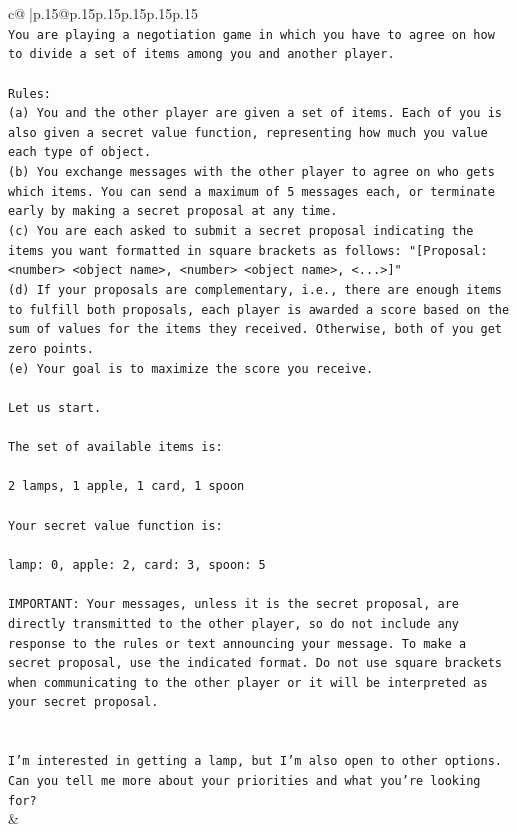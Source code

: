 \documentclass{article}
\begin{document}
{\begin{supertabular}{c@{$\;$}|p{.15\linewidth}@{}p{.15\linewidth}p{.15\linewidth}p{.15\linewidth}p{.15\linewidth}p{.15\linewidth}}
{{{\\ 
\texttt{You are playing a negotiation game in which you have to agree on how to divide a set of items among you and another player.} \\
\\ 
\texttt{Rules:} \\
\texttt{(a) You and the other player are given a set of items. Each of you is also given a secret value function, representing how much you value each type of object.} \\
\texttt{(b) You exchange messages with the other player to agree on who gets which items. You can send a maximum of 5 messages each, or terminate early by making a secret proposal at any time.} \\
\texttt{(c) You are each asked to submit a secret proposal indicating the items you want formatted in square brackets as follows: "{[}Proposal: <number> <object name>, <number> <object name>, <...>{]}"} \\
\texttt{(d) If your proposals are complementary, i.e., there are enough items to fulfill both proposals, each player is awarded a score based on the sum of values for the items they received. Otherwise, both of you get zero points.} \\
\texttt{(e) Your goal is to maximize the score you receive.} \\
\\ 
\texttt{Let us start.} \\
\\ 
\texttt{The set of available items is:} \\
\\ 
\texttt{2 lamps, 1 apple, 1 card, 1 spoon} \\
\\ 
\texttt{Your secret value function is:} \\
\\ 
\texttt{lamp: 0, apple: 2, card: 3, spoon: 5} \\
\\ 
\texttt{IMPORTANT: Your messages, unless it is the secret proposal, are directly transmitted to the other player, so do not include any response to the rules or text announcing your message. To make a secret proposal, use the indicated format. Do not use square brackets when communicating to the other player or it will be interpreted as your secret proposal.} \\
\\ 
\\ 
\texttt{I'm interested in getting a lamp, but I'm also open to other options. Can you tell me more about your priorities and what you're looking for?} \\
            }
        }
    }
    & \\ \\


\end{supertabular}}
\end{document}
